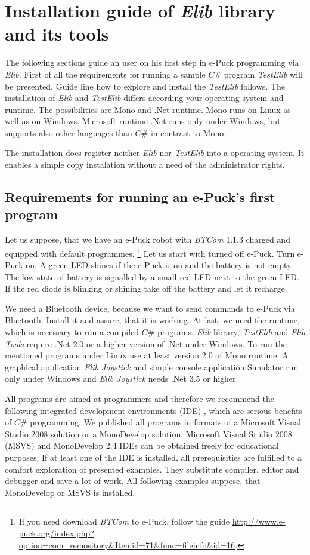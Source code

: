   \chapter{Installation guide of {\it Elib} library and its tools} 
  \label{app:installelib}
    The following sections guide an user on his first step in e-Puck programming via {\it Elib}.
    First of all the requirements for running a sample $C\#$ program {\it TestElib} will be presented.
    Guide line how to explore and install the {\it TestElib} follows.
    The installation of {\it Elib} and {\it TestElib} differs according your operating system and runtime.
    The possibilities are Mono\cite{mono} and .Net runtime. Mono runs on Linux as well as on Windows. Microsoft runtime .Net
    runs only under Windows, but supports also other languages than $C\#$ in contrast to Mono.

    The installation does register neither {\it Elib} nor {\it TestElib} into a operating system. It enables
    a simple copy instalation without a need of the administrator rights.
  \section{Requirements for running an e-Puck's first program}
  \label{sec:require}
  Let us suppose, that we have an e-Puck robot with {\it BTCom} 1.1.3 charged and equipped with default programmes.
  \footnote{\small{If you need download {\it BTCom} to e-Puck, follow the guide 
  \url{http://www.e-puck.org/index.php?option=com_remository&Itemid=71&func=fileinfo&id=16}.}}
  Let us start with turned off e-Puck. Turn e-Puck on.
  A green LED shines if the e-Puck is on and the battery is not empty.
  The low state of battery is signalled by a small red LED next to the green LED. 
  If the red diode is blinking or shining take off the battery and let it recharge.


  We need a Bluetooth device, because we want to send commands to e-Puck via Bluetooth. Install it and assure,
  that it is working.
  At last, we need the runtime, which is necessary to run a compiled $C\#$ programs. 
  {\it Elib} library, {\it TestElib} and {\it Elib Tools} require .Net 2.0 or a higher version of .Net under Windows.
  To run the mentioned programs under Linux use at least version 2.0 of Mono runtime.
  A graphical application {\it Elib Joystick} and simple console application Simulator
  run only under Windows and {\it Elib Joystick} needs .Net 3.5 or higher.

  All programs are aimed at programmers and therefore we recommend the following integrated development environments (IDE) ,
  which are serious benefits of $C\#$ programming.
  We published all programs in formats of a Microsoft Visual Studio 2008 solution or a MonoDevelop solution.  
  Microsoft Visual Studio 2008 (MSVS) and MonoDevelop 2.4 IDEs can be obtained freely for educational purposes.
  If at least one of the IDE is installed, all prerequisities are fulfilled to a comfort exploration of presented examples. 
  They substitute compiler, editor and debugger and save a lot of work.
  All following examples suppose, that MonoDevelop or MSVS is installed.

